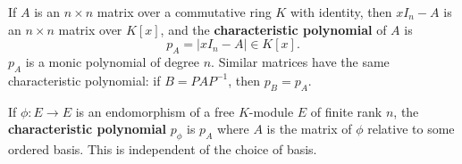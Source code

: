 If $A$ is an $n \times n$ matrix over a commutative ring $K$ with identity, then $xI_n - A$ is an $n \times n$ matrix over $K[x]$, and the \textbf{characteristic polynomial} of $A$ is
\[
p_A = |xI_n - A| \in K[x].
\]
$p_A$ is a monic polynomial of degree $n$. Similar matrices have the same characteristic polynomial: if $B = PAP^{-1}$, then $p_B = p_A$.

If $\phi : E \to E$ is an endomorphism of a free $K$-module $E$ of finite rank $n$, the \textbf{characteristic polynomial} $p_\phi$ is $p_A$ where $A$ is the matrix of $\phi$ relative to some ordered basis. This is independent of the choice of basis.
